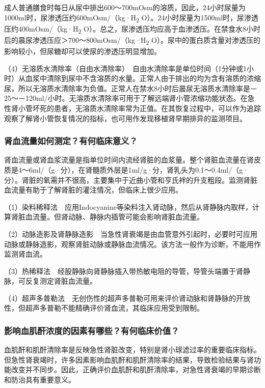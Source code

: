 成人普通膳食时每日从尿中排出600～700mOsm的溶质，因此，24小时尿量为1000ml时，尿渗透压约600mOsm/（kg·H\textsubscript{2}
O）。24小时尿量为1500ml时，尿渗透压约400mOsm/（kg·H\textsubscript{2}
O）。总之，尿渗透压均应高于血渗透压。在禁食水8小时后的晨尿渗透压应＞700～800mOsm/（kg·H\textsubscript{2}
O）。尿中的蛋白质含量对渗透压的影响较小，但尿糖却可以使尿的渗透压明显增加。

（4）无溶质水清除率（自由水清除率）　自由水清除率是单位时间（1分钟或1小时）从血浆中清除到尿中不含溶质的水量。正常人由于排出的均为含有溶质的浓缩尿，所以无溶质水清除率为负值。正常人在禁水8小时后晨尿无溶质水清除率是－25～－120ml/小时。无溶质水清除率可用于了解远端肾小管浓缩功能状态。在急性肾小管坏死的患者，无溶质水清除率常为正值。在其恢复过程中，可以作为追踪观察了解肾小管恢复情况的指标，也可用作发现移植肾早期排异的监测项目。

\subsubsection{肾血流量如何测定？有何临床意义？}

肾血流量或肾血浆流量是指单位时间内流经肾脏的血浆量。整个肾脏血流量在肾皮质是4～6ml/（g·分），在肾髓质外层是1ml/g·分，肾乳头为0.1～0.4ml/（g·分）。肾脏的氧需并不很高，主要集中于近曲小管和亨氏袢的升支粗段。监测肾脏血流量有助于了解肾脏的灌注情况，但临床上很少应用。

（1）染料稀释法　应用Indocyanine等染料注入肾动脉，然后从肾静脉内取样，计算肾脏血流量。但肾动脉、静脉内插管可能会影响肾脏血流量。

（2）动脉造影及肾静脉造影　当急性肾衰竭是由血管意外引起时，必要时可应用动脉或静脉造影，观察肾脏动脉或静脉血流情况。该方法一般作为诊断，不能用作监测肾血流。

（3）热稀释法　经股静脉向肾静脉插入带热敏电阻的导管，导管头端置于肾静脉，可反复测定肾脏血流量。

（4）超声多普勒法　无创伤性的超声多普勒可用来评价肾动脉和肾静脉的开放性，但超声多普勒不能精确评价肾血流，其临床应用受到限制。

\subsubsection{影响血肌酐浓度的因素有哪些？有何临床价值？}

血肌酐和肌酐清除率是反映急性肾脏改变，特别是肾小球滤过率的重要临床指标。但急性肾衰竭时，许多因素影响血肌酐和肌酐清除率的结果，导致检验结果与肾功能改变并不同步。因此，正确评价血肌酐和肌酐清除率，对急性肾衰竭的早期诊断和防治具有重要意义。

